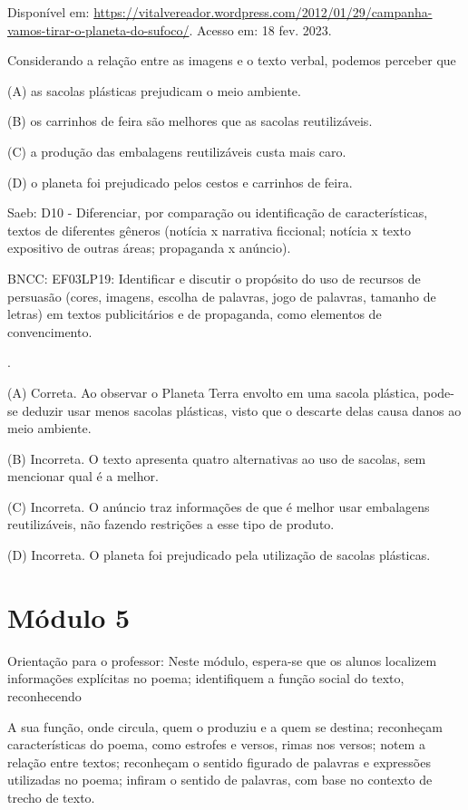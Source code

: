 Disponível em:
\url{https://vitalvereador.wordpress.com/2012/01/29/campanha-vamos-tirar-o-planeta-do-sufoco/}.
Acesso em: 18 fev. 2023.

Considerando a relação entre as imagens e o texto verbal, podemos
perceber que

(A) as sacolas plásticas prejudicam o meio ambiente.

(B) os carrinhos de feira são melhores que as sacolas reutilizáveis.

(C) a produção das embalagens reutilizáveis custa mais caro.

(D) o planeta foi prejudicado pelos cestos e carrinhos de feira.

Saeb: D10 - Diferenciar, por comparação ou identificação de
características, textos de diferentes gêneros (notícia x narrativa
ficcional; notícia x texto expositivo de outras áreas; propaganda x
anúncio).

BNCC: EF03LP19: Identificar e discutir o propósito do uso de recursos de
persuasão (cores, imagens, escolha de palavras, jogo de palavras,
tamanho de letras) em textos publicitários e de propaganda, como
elementos de convencimento.

.

(A) Correta. Ao observar o Planeta Terra envolto em uma sacola plástica,
pode-se deduzir usar menos sacolas plásticas, visto que o descarte delas
causa danos ao meio ambiente.

(B) Incorreta. O texto apresenta quatro alternativas ao uso de sacolas,
sem mencionar qual é a melhor.

(C) Incorreta. O anúncio traz informações de que é melhor usar
embalagens reutilizáveis, não fazendo restrições a esse tipo de produto.

(D) Incorreta. O planeta foi prejudicado pela utilização de sacolas
plásticas.

\section{Módulo 5}\label{muxf3dulo-5}

Orientação para o professor: Neste módulo, espera-se que os alunos
localizem informações explícitas no poema; identifiquem a função social
do texto, reconhecendo

A sua função, onde circula, quem o produziu e a quem se destina;
reconheçam características do poema, como estrofes e versos, rimas nos
versos; notem a relação entre textos; reconheçam o sentido figurado de
palavras e expressões utilizadas no poema; infiram o sentido de
palavras, com base no contexto de trecho de texto.

